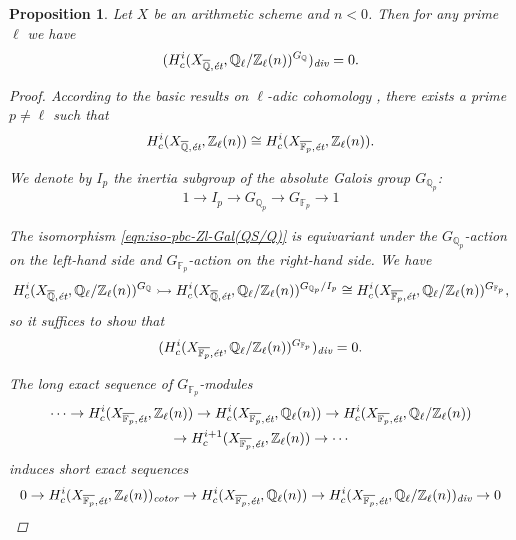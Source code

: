 \documentclass[leqno,12pt]{article}
\theoremstyle{plain}
\newtheorem{proposition}[theorem]{\indent\sc Proposition}
\theoremstyle{definition}
\newcommand{\FF}{\mathbb{F}}
\newcommand{\QQ}{\mathbb{Q}}
\newcommand{\ZZ}{\mathbb{Z}}
\renewcommand{\div}{\text{\it div}}
\newcommand{\cotor}{\text{\it cotor}}
\begin{document}
\begin{proposition}
  \label{prop:l-adic-cohomology-key-lemma}
  Let $X$ be an arithmetic scheme and $n < 0$. Then for any prime $\ell$ we have
  $$(H^i_c (X_{\overline{\QQ},\text{\it \'{e}t}}, \QQ_\ell/\ZZ_\ell (n))^{G_\QQ})_\div = 0.$$

  \begin{proof}
    According to the basic results on $\ell$-adic cohomology
    \cite[Expos\'{e}~VI]{SGA5}, there exists a prime $p \ne \ell$ such that
    \begin{equation}
      \label{eqn:iso-pbc-Zl-Gal(QS/Q)}
      H^i_c (X_{\overline{\QQ}, \text{\it \'{e}t}}, \ZZ_\ell (n)) \cong H^i_c (X_{\overline{\FF_p}, \text{\it \'{e}t}}, \ZZ_\ell (n)).
    \end{equation}

    We denote by $I_p$ the inertia subgroup of the absolute Galois group
    $G_{\QQ_p}$:
    $$1 \to I_p \to G_{\QQ_p} \to G_{\FF_p} \to 1$$

    The isomorphism \eqref{eqn:iso-pbc-Zl-Gal(QS/Q)} is equivariant under the
    $G_{\QQ_p}$-action on the left-hand side and $G_{\FF_p}$-action on the
    right-hand side. We have
    \[ H^i_c (X_{\overline{\QQ}, \text{\it \'{e}t}}, \QQ_\ell/\ZZ_\ell (n))^{G_\QQ} \rightarrowtail
    H^i_c (X_{\overline{\QQ}, \text{\it \'{e}t}}, \QQ_\ell/\ZZ_\ell (n))^{G_{\QQ_p}/I_p}
    \cong H^i_c (X_{\overline{\FF_p}, \text{\it \'{e}t}}, \QQ_\ell/\ZZ_\ell (n))^{G_{\FF_p}}, \]
    so it suffices to show that
    $$(H^i_c (X_{\overline{\FF_p},\text{\it \'{e}t}}, \QQ_\ell/\ZZ_\ell (n))^{G_{\FF_p}})_\div = 0.$$

    The long exact sequence of $G_{\FF_p}$-modules
    \begin{multline*}
      \cdots \to
      H^i_c (X_{\overline{\FF_p},\text{\it \'{e}t}}, \ZZ_\ell (n)) \to
      H^i_c (X_{\overline{\FF_p},\text{\it \'{e}t}}, \QQ_\ell (n)) \to
      H^i_c (X_{\overline{\FF_p},\text{\it \'{e}t}}, \QQ_\ell/\ZZ_\ell (n)) \\
      \to H^{i+1}_c (X_{\overline{\FF_p},\text{\it \'{e}t}}, \ZZ_\ell (n)) \to
      \cdots
    \end{multline*}
    induces short exact sequences
    \begin{equation}
      \label{eqn:Zl-Ql-Ql/Zl-ses}
      0 \to H^i_c (X_{\overline{\FF_p},\text{\it \'{e}t}}, \ZZ_\ell (n))_\cotor \to
      H^i_c (X_{\overline{\FF_p},\text{\it \'{e}t}}, \QQ_\ell (n)) \to
      H^i_c (X_{\overline{\FF_p},\text{\it \'{e}t}}, \QQ_\ell/\ZZ_\ell (n))_\div \to 0
    \end{equation}


\end{proof}
\end{proposition}
\end{document}
